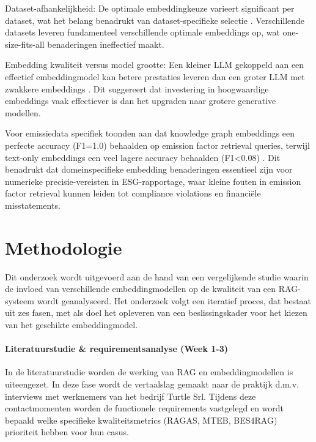 Dataset-afhankelijkheid: De optimale embeddingkeuze varieert significant per dataset, wat het belang benadrukt van dataset-specifieke selectie \autocite{Canale2025}. Verschillende datasets leveren fundamenteel verschillende optimale embeddings op, wat one-size-fits-all benaderingen ineffectief maakt.

Embedding kwaliteit versus model grootte: Een kleiner LLM gekoppeld aan een effectief embeddingmodel kan betere prestaties leveren dan een groter LLM met zwakkere embeddings \autocite{Canale2025}. Dit suggereert dat investering in hoogwaardige embeddings vaak effectiever is dan het upgraden naar grotere generative modellen.

Voor emissiedata specifiek toonden \textcite{Zhao2025} aan dat knowledge graph embeddings een perfecte accuracy (F1=1.0) behaalden op emission factor retrieval queries, terwijl text-only embeddings een veel lagere accuracy behaalden (F1<0.08) \autocite{Zhao2025}. Dit benadrukt dat domeinspecifieke embedding benaderingen essentieel zijn voor numerieke precisie-vereisten in ESG-rapportage, waar kleine fouten in emission factor retrieval kunnen leiden tot compliance violations en financi\"ele misstatements.

\section{Methodologie}
\label{sec:methodologie}

Dit onderzoek wordt uitgevoerd aan de hand van een vergelijkende studie waarin de invloed van verschillende embeddingmodellen op de kwaliteit van een RAG-systeem wordt geanalyseerd. Het onderzoek volgt een iteratief proces, dat bestaat uit zes fasen, met als doel het opleveren van een beslissingskader voor het kiezen van het geschikte embeddingmodel.

\paragraph{Literatuurstudie \& requirementsanalyse (Week 1-3)}

In de literatuurstudie worden de werking van RAG en embeddingmodellen is uiteengezet. In deze fase wordt de vertaalslag gemaakt naar de praktijk d.m.v. interviews met werknemers van het bedrijf Turtle Srl. Tijdens deze contactmomenten worden de functionele requirements vastgelegd en wordt bepaald welke specifieke kwaliteitsmetrics (RAGAS, MTEB, BES4RAG) prioriteit hebben voor hun casus.

